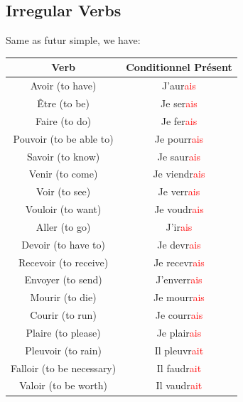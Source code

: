 \documentclass{book}
\begin{document}
\subsection{Irregular Verbs}
Same as futur simple, we have:
\begin{center}
    \begin{tabular}{|c|c|}
        \hline
        \textbf{Verb} & \textbf{Conditionnel Présent} \\
        \hline
        Avoir (to have) & J'aur\textcolor{red}{ais} \\
        \hline
        Être (to be) & Je ser\textcolor{red}{ais} \\
        \hline
        Faire (to do) & Je fer\textcolor{red}{ais} \\
        \hline
        Pouvoir (to be able to) & Je pourr\textcolor{red}{ais} \\
        \hline
        Savoir (to know) & Je saur\textcolor{red}{ais} \\
        \hline
        Venir (to come) & Je viendr\textcolor{red}{ais} \\
        \hline
        Voir (to see) & Je verr\textcolor{red}{ais} \\
        \hline
        Vouloir (to want) & Je voudr\textcolor{red}{ais} \\
        \hline
        Aller (to go) & J'ir\textcolor{red}{ais} \\
        \hline
        Devoir (to have to) & Je devr\textcolor{red}{ais} \\
        \hline
        Recevoir (to receive) & Je recevr\textcolor{red}{ais} \\
        \hline
        Envoyer (to send) & J'enverr\textcolor{red}{ais} \\
        \hline
        Mourir (to die) & Je mourr\textcolor{red}{ais} \\
        \hline
        Courir (to run) & Je courr\textcolor{red}{ais} \\
        \hline
        Plaire (to please) & Je plair\textcolor{red}{ais} \\
        \hline
        Pleuvoir (to rain) & Il pleuvr\textcolor{red}{ait} \\
        \hline
        Falloir (to be necessary) & Il faudr\textcolor{red}{ait} \\
        \hline
        Valoir (to be worth) & Il vaudr\textcolor{red}{ait} \\
        \hline
    \end{tabular}
\end{center}
\end{document}
